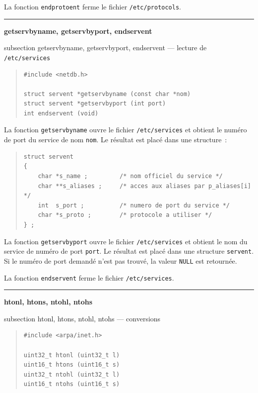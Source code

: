 \documentclass [twoside] {report}
\newcommand {\primitive} [1]
    {
	\phantomsection
	{\large \textbf {#1}}
	\addcontentsline {toc} {subsection} {#1}
    }
\newcommand {\separation}
    {
	\vspace {5mm}
	\nopagebreak
	\hrule
    }
\begin{document}
La fonction \texttt {endprotoent} ferme le fichier \texttt {/etc/protocols}.


\separation
\primitive {getservbyname, getservbyport,
endservent} --- lecture de \texttt {/etc/services}

\begin {quote}
\begin {verbatim}
#include <netdb.h>

struct servent *getservbyname (const char *nom)
struct servent *getservbyport (int port)
int endservent (void)
\end{verbatim}
\end {quote}

La fonction \texttt {getservbyname} ouvre le fichier \texttt {/etc/services} et
obtient le numéro de port du service de nom \texttt {nom}.  Le résultat est
placé dans une structure~:

\begin {quote}
    \small
\begin {verbatim}
struct servent
{
    char *s_name ;         /* nom officiel du service */
    char **s_aliases ;     /* acces aux aliases par p_aliases[i] */
    int  s_port ;          /* numero de port du service */
    char *s_proto ;        /* protocole a utiliser */
} ;
\end{verbatim}
\end {quote}

La fonction \texttt {getservbyport} ouvre le fichier \texttt {/etc/services} et
obtient le nom du service de numéro de port \texttt {port}.  Le résultat est
placé dans une structure \texttt {servent}.  Si le numéro de port demandé
n'est pas trouvé, la valeur \texttt {NULL} est retournée.

La fonction \texttt {endservent} ferme le fichier \texttt {/etc/services}.


\separation
\primitive {htonl, htons, ntohl, ntohs} --- conversions

\begin {quote}
\begin {verbatim}
#include <arpa/inet.h>

uint32_t htonl (uint32_t l)
uint16_t htons (uint16_t s)
uint32_t ntohl (uint32_t l)
uint16_t ntohs (uint16_t s)
\end{verbatim}
\end {quote}
\end{document}
